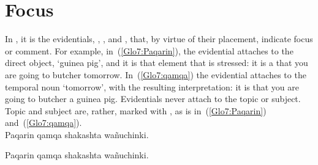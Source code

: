 \section{Focus}\label{sec:emphasis}
In \SYQ, it is the evidentials, , , and , that, by virtue of their placement, indicate focus or comment. For example, in~(\ref{Glo7:Paqarin}), the evidential attaches to the direct object,  ‘guinea pig’, and it is that element that is stressed: it is a  that you are going to butcher tomorrow. In~(\ref{Glo7:qamqa}) the evidential attaches to the temporal noun  ‘tomorrow’, with the resulting interpretation: it is  that you are going to butcher a guinea pig. Evidentials never attach to the topic or subject. Topic and subject are, rather, marked with , as is  in~(\ref{Glo7:Paqarin}) and~(\ref{Glo7:qamqa}).\\

%
{Paqarin qamqa shakashta wañuchinki.~\updag}%
{}%
{}{}%

%
{Paqarin qamqa shakashta wañuchinki.~\updag}%
{}%
{}{}%

